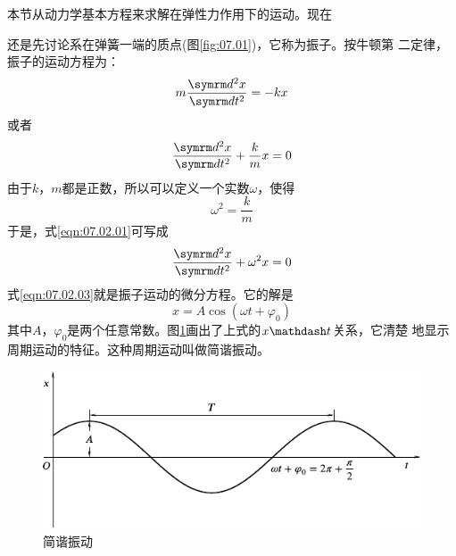 \section[振动解]{}\label{sec:07.02}

本节从动力学基本方程来求解在弹性力作用下的运动。现在

\noindent
还是先讨论系在弹簧一端的质点(图\ref{fig:07.01})，它称为振子。按牛顿第
二定律，振子的运动方程为：
\begin{equation*}
  m \frac { \dif ^ { 2 } x } { \dif t ^ { 2 } } = - k x
\end{equation*}
或者
\begin{equation}\label{eqn:07.02.01}
  \frac { \dif ^ { 2 } x } { \dif t ^ { 2 } } + \frac { k } { m } x = 0
\end{equation}
由于$ k $，$ m $都是正数，所以可以定义一个实数$ \omega $，使得
\begin{equation}\label{eqn:07.02.02}
  \omega ^ { 2 } = \frac { k } { m }
\end{equation}
于是，式\eqref{eqn:07.02.01}可写成
\begin{equation}\label{eqn:07.02.03}
  \frac { \dif ^ { 2 } x } { \dif t ^ { 2 } } + \omega ^ { 2 } x = 0
\end{equation}
式\eqref{eqn:07.02.03}就是振子运动的微分方程。它的解是
\begin{equation}\label{eqn:07.02.04}
  x = A \cos \left( \omega t + \varphi _ { 0 } \right)
\end{equation}
其中$ A $，$ \varphi _ { 0 } $是两个任意常数。图\ref{fig:07.05}\;画出了上式的$ x \mathdash t $关系，它清楚
地显示周期运动的特征。这种周期运动叫做简谐振动。
\begin{figure}[h]
  \vspace{1em}
  \centering
  \includegraphics{figure/fig07.05}
  \caption{简谐振动}
  \label{fig:07.05}
\end{figure}

